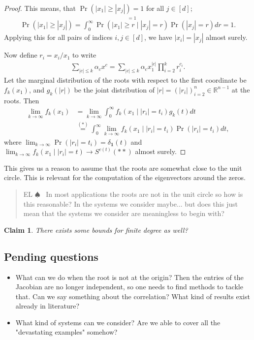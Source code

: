 \documentclass[12pt]{article}
\def\R{\mathbb{R}}
\newenvironment{el}{\begin{quote}\color{amethyst} \small\sf EL $\spadesuit$~}{\end{quote}}
\newtheorem{claim}{Claim}[section]
\begin{document}
\begin{proof}
    This means, that $\Pr(|x_1| \geq |x_j|) = 1$ for all $j \in [d]$;
    \begin{align*}
       \Pr(|x_1|\geq |x_j|) = \int_0^\infty \stackrel{= 1}{\Pr(|x_1| \geq r \mid |x_j| = r)} \Pr(|x_j| = r) dr = 1. 
    \end{align*}
    Applying this for all pairs of indices $i,j \in [d]$, we have $|x_i| = |x_j|$ almost surely.
    

    Now define $r_i = x_i/x_1$ to write
    \begin{align*}
        \sum_{|c| \leq k} \alpha_c x^c =  \sum_{|c| \leq k} \alpha_c x_1^{|c|} \prod_{i=2}^k r_i^{c_i}.
    \end{align*}
    Let the marginal distribution of the roots with respect to the first coordinate be $f_k(x_1)$, and $g_k(|r|)$ be the joint distribution of $|r| = (|r_i|)_{i=2}^n \in \R^{n-1}$ at the roots. Then
    \begin{align*}
        \lim_{k\to \infty} f_k(x_1) &= \lim_{k\to \infty} \int_0^\infty f_k(x_1 \mid |r_i| = t_i) g_k( t) dt \\ 
        &\stackrel{(*)}{=} \int_0^\infty \lim_{k\to \infty}  f_k(x_1 \mid |r_i| = t_i) \Pr(|r_i| = t_i) dt,
    \end{align*}
    where $\lim_{k\to \infty} \Pr(|r_i| = t_i) = \delta_{\mathbf{1}}(t)$ and $\lim_{k\to \infty} f_k(x_1 \mid |r_i| = t) \to S^{c(t)} (**)$ almost surely. 
     
\end{proof}

This gives us a reason to assume that the roots are somewhat close to the unit circle.
This is relevant for the computation of the eigenvectors around the zeros.
\begin{el}
    In most applications the roots are not in the unit circle so how is this reasonable?
    In the systems we consider maybe...
    but does this just mean that the systems we consider are meaningless to begin with?
\end{el}


\begin{claim}
    There exists some bounds for finite degree as well?
\end{claim}


\subsection{Pending questions}

\begin{itemize}
    \item  What can we do when the root is not at the origin? Then the entries of the Jacobian are no longer independent, so one needs to find methods to tackle that.
    Can we say something about the correlation?
    What kind of results exist already in literature?

    \item What kind of systems can we consider? Are we able to cover all the "devastating examples" somehow?
\end{itemize}




\end{document}
